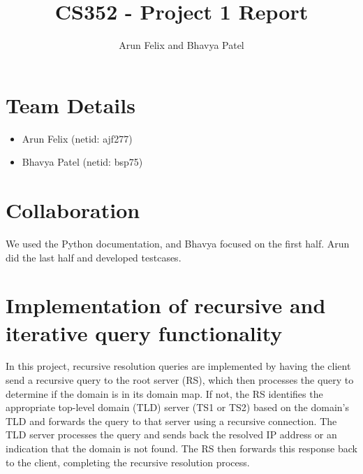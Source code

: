 \documentclass{article}
\begin{document}
\title{CS352 - Project 1 Report}
\author{Arun Felix and Bhavya Patel}
\maketitle

\section{Team Details}

\begin{itemize}
    \item Arun Felix (netid: ajf277)
    \item Bhavya Patel (netid: bsp75)
\end{itemize}

\section{Collaboration}

We used the Python documentation, and Bhavya focused on the first half. Arun did the last half and developed testcases.

\section{Implementation of recursive and iterative query functionality}

In this project, recursive resolution queries are implemented by having the client send a recursive query to the root server (RS), which then processes the query to determine if the domain is in its domain map. 
If not, the RS identifies the appropriate top-level domain (TLD) server (TS1 or TS2) based on the domain's TLD and forwards the query to that server using a recursive connection. 
The TLD server processes the query and sends back the resolved IP address or an indication that the domain is not found. 
The RS then forwards this response back to the client, completing the recursive resolution process.
\end{document}
